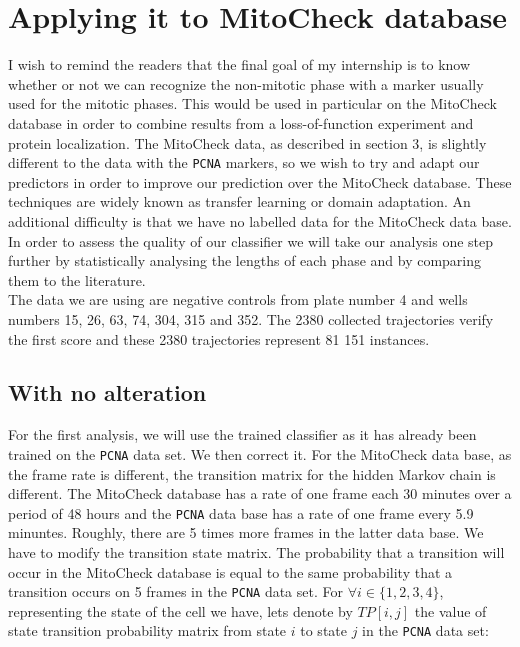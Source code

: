 \documentclass{article}
\begin{document}



\newpage



\newpage



\newpage



\newpage




\section{Applying it to MitoCheck database}


I wish to remind the readers that the final goal of my internship is to know whether or not we can recognize the non-mitotic phase with a marker usually used for the mitotic phases. This would be used in particular on the MitoCheck database in order to combine results from a loss-of-function experiment and protein localization. The MitoCheck data, as described in section 3, is slightly different to the data with the \texttt{PCNA} markers, so we wish to try and adapt our predictors in order to improve our prediction over the MitoCheck database. These techniques are widely known as transfer learning or domain adaptation. An additional difficulty is that we have no labelled data for the MitoCheck data base. In order to assess the quality of our classifier we will take our analysis one step further by statistically analysing the lengths of each phase and by comparing them to the literature. \\
The data we are using are negative controls from plate number 4 and wells numbers 15, 26, 63, 74, 304, 315 and 352. The 2380 collected trajectories verify the first score and these 2380 trajectories represent 81 151 instances.

\subsection{With no alteration}
For the first analysis, we will use the trained classifier as it has already been trained on the \texttt{PCNA} data set. We then correct it. For the MitoCheck data base, as the frame rate is different, the transition matrix for the hidden Markov chain is different. The MitoCheck database has a rate of one frame each 30 minutes over a period of 48 hours and the \texttt{PCNA} data base has a rate of one frame every 5.9 minuntes. Roughly, there are 5 times more frames in the latter data base. We have to modify the transition state matrix. The probability that a transition will occur in the MitoCheck database is equal to the same probability that a transition occurs on 5 frames in the \texttt{PCNA} data set. For $\forall i \in \lbrace 1,2,3,4 \rbrace$, representing the state of the cell we have, lets denote by $TP[i,j]$ the value of state transition probability matrix from state $i$ to state $j$ in the \texttt{PCNA} data set:
\end{document}
